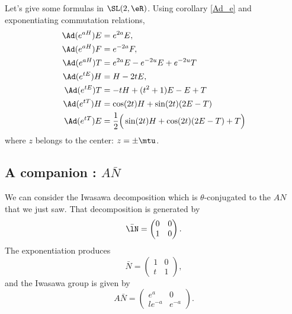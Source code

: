 Let's give some formulas in $\SL(2,\eR)$. Using corollary \ref{Ad_e} and exponentiating commutation relations,
\begin{subequations}  \label{eq_eaHsldr}
\begin{align}
\Ad(e^{aH})E&=e^{2a}E,\\
\Ad(e^{aH})F&=e^{-2a}F,\\
\Ad( e^{aH})T&= e^{2a}E- e^{-2u}E+ e^{-2u}T\\
\Ad(e^{tE})H&=H-2tE,   							\label{eq_AdetE}\\
\Ad( e^{tE})T&=-tH+(t^2+1)E-E+T\\
\Ad( e^{tT})H&=\cos(2t)H+\sin(2t)(2E-T)\\
\Ad( e^{tT})E&=\frac{ 1 }{2}\Big( \sin(2t)H+\cos(2t)(2E-T)+T \Big)
\end{align}
\end{subequations}
where $z$ belongs to the center: $z=\pm\mtu$.

					\subsection{A companion : \texorpdfstring{$A\bar N$}{AN}}

We can consider the Iwasawa decomposition which is $\theta$-conjugated to the $AN$ that we just saw. That decomposition is generated by
\begin{equation}
	\bar\lN=\begin{pmatrix}
	0	&	0	\\ 
	1	&	0
\end{pmatrix}.
\end{equation}
The exponentiation produces
\begin{equation}
	\bar N=\begin{pmatrix}
	1	&	0	\\ 
	t	&	1	
\end{pmatrix},
\end{equation}
and the Iwasawa group is given by
\begin{equation}		\label{EqGeneANbarSLdeuxR}
	A\bar N=\begin{pmatrix}
	e^a	&	0	\\ 
	l e^{-a}	&	 e^{-a}	
\end{pmatrix}.
\end{equation}

